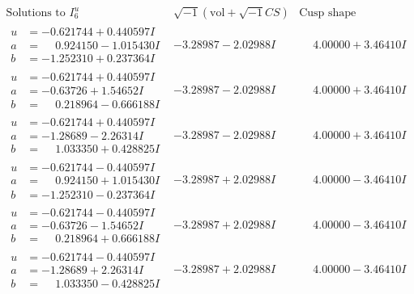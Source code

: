 \documentclass[1p]{elsarticle_modified}
\theoremstyle{definition}
\newcommand{\I}{\sqrt{-1}}
\begin{document}
$$\begin{array}{c|c|c}  
\text{Solutions to }I^u_{6}& \I (\text{vol} + \sqrt{-1}CS) & \text{Cusp shape}\\
 \hline 
\begin{aligned}
u &= -0.621744 + 0.440597 I \\
a &= \phantom{-}0.924150 - 1.015430 I \\
b &= -1.252310 + 0.237364 I\end{aligned}
 & -3.28987 - 2.02988 I & \phantom{-}4.00000 + 3.46410 I \\ \hline\begin{aligned}
u &= -0.621744 + 0.440597 I \\
a &= -0.63726 + 1.54652 I \\
b &= \phantom{-}0.218964 - 0.666188 I\end{aligned}
 & -3.28987 - 2.02988 I & \phantom{-}4.00000 + 3.46410 I \\ \hline\begin{aligned}
u &= -0.621744 + 0.440597 I \\
a &= -1.28689 - 2.26314 I \\
b &= \phantom{-}1.033350 + 0.428825 I\end{aligned}
 & -3.28987 - 2.02988 I & \phantom{-}4.00000 + 3.46410 I \\ \hline\begin{aligned}
u &= -0.621744 - 0.440597 I \\
a &= \phantom{-}0.924150 + 1.015430 I \\
b &= -1.252310 - 0.237364 I\end{aligned}
 & -3.28987 + 2.02988 I & \phantom{-}4.00000 - 3.46410 I \\ \hline\begin{aligned}
u &= -0.621744 - 0.440597 I \\
a &= -0.63726 - 1.54652 I \\
b &= \phantom{-}0.218964 + 0.666188 I\end{aligned}
 & -3.28987 + 2.02988 I & \phantom{-}4.00000 - 3.46410 I \\ \hline\begin{aligned}
u &= -0.621744 - 0.440597 I \\
a &= -1.28689 + 2.26314 I \\
b &= \phantom{-}1.033350 - 0.428825 I\end{aligned}
 & -3.28987 + 2.02988 I & \phantom{-}4.00000 - 3.46410 I \\ \hline\begin{aligned}

\end{aligned}
\end{array}$$
\end{document}

